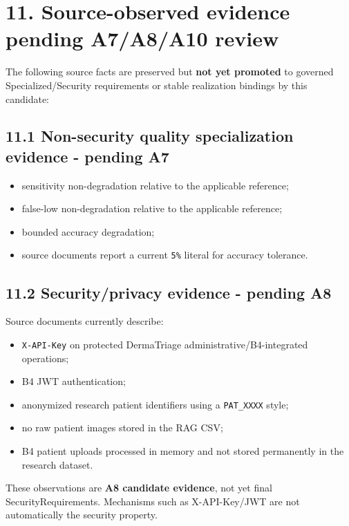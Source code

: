 \documentclass[11pt,a4paper]{article}
\providecommand{\tightlist}{\setlength{\itemsep}{0pt}\setlength{\parskip}{0pt}}
\begin{document}
\section{11. Source-observed evidence pending A7/A8/A10
review}\label{11-source-observed-evidence-pending-a7a8a10-review}

The following source facts are preserved but \textbf{not yet promoted}
to governed Specialized/Security requirements or stable realization
bindings by this candidate:

\subsection{11.1 Non-security quality specialization evidence - pending
A7}\label{111-non-security-quality-specialization-evidence---pending-a7}

\begin{itemize}
\tightlist
\item
  sensitivity non-degradation relative to the applicable reference;
\item
  false-low non-degradation relative to the applicable reference;
\item
  bounded accuracy degradation;
\item
  source documents report a current \texttt{5\%} literal for accuracy
  tolerance.
\end{itemize}

\subsection{11.2 Security/privacy evidence - pending
A8}\label{112-securityprivacy-evidence---pending-a8}

Source documents currently describe:

\begin{itemize}
\tightlist
\item
  \texttt{X-API-Key} on protected DermaTriage
  administrative/B4-integrated operations;
\item
  B4 JWT authentication;
\item
  anonymized research patient identifiers using a \texttt{PAT\_XXXX}
  style;
\item
  no raw patient images stored in the RAG CSV;
\item
  B4 patient uploads processed in memory and not stored permanently in
  the research dataset.
\end{itemize}

These observations are \textbf{A8 candidate evidence}, not yet final
SecurityRequirements. Mechanisms such as X-API-Key/JWT are not
automatically the security property.
\end{document}
